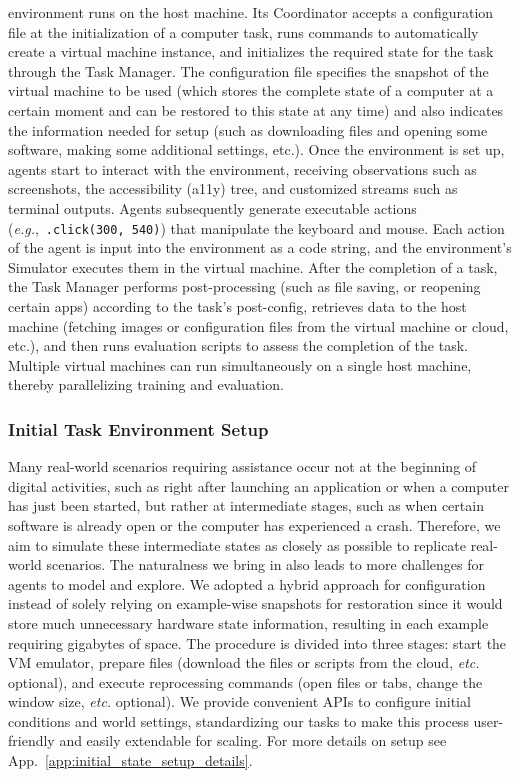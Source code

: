\ours environment runs on the host machine.
Its Coordinator accepts a configuration file at the initialization of a computer task, runs commands to automatically create a virtual machine instance, and initializes the required state for the task through the Task Manager.
The configuration file specifies the snapshot of the virtual machine to be used (which stores the complete state of a computer at a certain moment and can be restored to this state at any time) and also indicates the information needed for setup (such as downloading files and opening some software, making some additional settings, etc.).
Once the environment is set up, agents start to interact with the environment, receiving observations such as screenshots, the accessibility (a11y) tree, and customized streams such as terminal outputs.
Agents subsequently generate executable actions (\textit{e.g.},~\texttt{.click(300, 540)}) that manipulate the keyboard and mouse.
Each action of the agent is input into the environment as a code string, and the environment's Simulator executes them in the virtual machine. 
After the completion of a task, the Task Manager performs post-processing (such as file saving, or reopening certain apps) according to the task's post-config, retrieves data to the host machine (fetching images or configuration files from the virtual machine or cloud, etc.), and then runs evaluation scripts to assess the completion of the task.
Multiple virtual machines can run simultaneously on a single host machine, thereby parallelizing training and evaluation.

\subsubsection{Initial Task Environment Setup}
\label{init_setup}
Many real-world scenarios requiring assistance occur not at the beginning of digital activities, such as right after launching an application or when a computer has just been started, but rather at intermediate stages, such as when certain software is already open or the computer has experienced a crash. 
Therefore, we aim to simulate these intermediate states as closely as possible to replicate real-world scenarios.
The naturalness we bring in also leads to more challenges for agents to model and explore.
We adopted a hybrid approach for configuration instead of solely relying on example-wise snapshots for restoration since it would store much unnecessary hardware state information, resulting in each example requiring gigabytes of space.
The procedure is divided into three stages: start the VM emulator, prepare files (download the files or scripts from the cloud, \textit{etc.} optional), and execute reprocessing commands (open files or tabs, change the window size, \textit{etc.} optional).
We provide convenient APIs to configure initial conditions and world settings, standardizing our tasks to make this process user-friendly and easily extendable for scaling.
For more details on setup see App.~\ref{app:initial_state_setup_details}.

